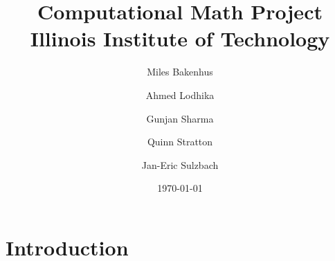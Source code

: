 \documentclass{report}
\title{Computational Math Project\\
  {\large Illinois Institute of Technology}
}
\author{
  Miles Bakenhus 
  \and
  Ahmed Lodhika 
  \and
  Gunjan Sharma 
  \and
  Quinn Stratton 
  \and
  Jan-Eric Sulzbach 
}
\date{\today}
\numberwithin{pic}{section}
\numberwithin{lem}{section}
\numberwithin{thm}{section}
\numberwithin{cor}{section}
\theoremstyle{definition}
\numberwithin{ex}{section}
\numberwithin{defn}{section}
\theoremstyle{definition}
\theoremstyle{remark}
\begin{document}
\fancyhead[l]{}
\fancyhead[c]{}
\fancyhead[r]{}

\maketitle

\tableofcontents


\section{Introduction}
\end{document}
